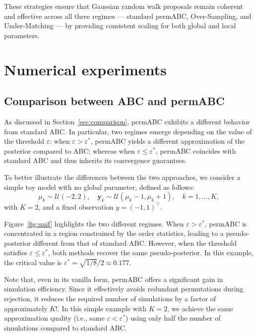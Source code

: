 \documentclass[lineno]{biometrika}
\def\obsdata{\mathbf{y}}
\def\xian#1{\textcolor{orange}{\textit{// X: #1}}}
\begin{document}


These strategies ensure that Gaussian random walk proposals remain coherent and effective across all three regimes — standard permABC, Over-Sampling, and Under-Matching — by providing consistent scaling for both global and local parameters.


\section{Numerical experiments}
\label{sec:numeric}
\subsection{Comparison between ABC and permABC}
\label{sec:abc_vs_permabc}

As discussed in Section~\ref{sec:comparison}, permABC exhibits a different behavior from standard ABC. In particular, two regimes emerge depending on the value of the threshold \( \varepsilon \): when \( \varepsilon > \varepsilon^* \), permABC yields a different approximation of the posterior compared to ABC; whereas when \( \varepsilon \leq \varepsilon^* \), permABC coincides with standard ABC and thus inherits its convergence guarantees.

To better illustrate the differences between the two approaches, we consider a simple toy model with no global parameter, defined as follows:
\[
\mu_k \sim \mathcal{U}(-2, 2), \quad \obsdata_k \sim \mathcal{U}(\mu_k - 1, \mu_k + 1), \quad k = 1, \dots, K,
\]
with \( K = 2 \), and a fixed observation \( y = (-1, 1)^\top \). 

Figure~\ref{fig:unif} highlights the two different regimes. When \( \varepsilon > \varepsilon^* \), permABC is concentrated in a region constrained by the order statistics, leading to a pseudo-posterior different from that of standard ABC. However, when the threshold satisfies \( \varepsilon \leq \varepsilon^* \), both methods recover the same pseudo-posterior. In this example, the critical value is \( \varepsilon^* = \sqrt{1/8}/2 \approx 0.177 \).


Note that, even in its vanilla form, permABC offers a significant gain in simulation efficiency. Since it effectively avoids redundant permutations during rejection, it reduces the required number of simulations by a factor of approximately \( K! \). In this simple example with \( K = 2 \), we achieve the same approximation quality (i.e., same \( \varepsilon < \varepsilon^* \)) using only half the number of simulations compared to standard ABC.
\end{document}
